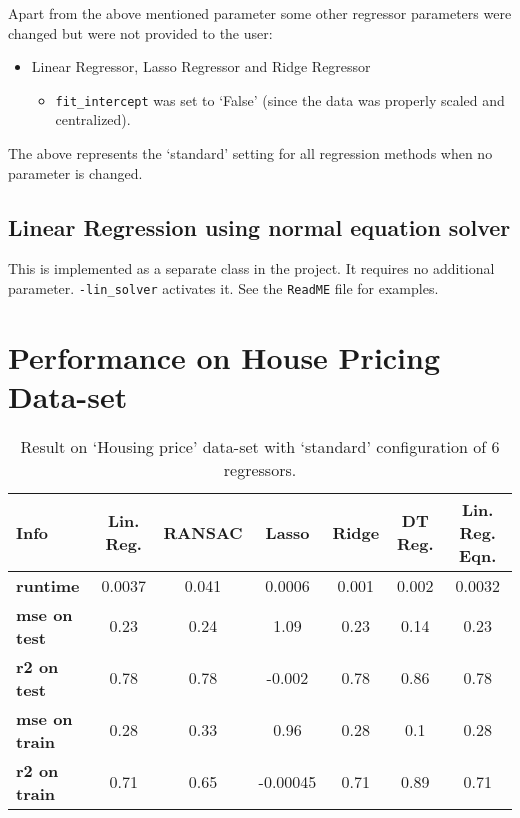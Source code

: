 \documentclass[12pt]{article}
\begin{document}
Apart from the above mentioned parameter some other regressor parameters were changed but were not provided to the user:

\begin{itemize}
\item Linear Regressor, Lasso Regressor and Ridge Regressor
\begin{itemize}
\item \texttt{fit\_intercept} was set to `False' (since the data was properly scaled and centralized).
\end{itemize}
\end{itemize}

The above represents the `standard' setting for all regression methods when no parameter is changed. 

\subsection*{Linear Regression using normal equation solver}

This is implemented as a separate class in the project. It requires no additional parameter. \texttt{-lin\_solver} activates it. See the \texttt{ReadME} file for examples.

\section*{Performance on House Pricing Data-set}

\begin{table}[!hptb]
\begin{tabular}{|l|c|c|c|c|c|c|}
\hline
\textbf{Info} & \textbf{Lin. Reg.} & \textbf{RANSAC} & \textbf{Lasso} & \textbf{Ridge} & \textbf{DT Reg.} & \textbf{Lin. Reg. Eqn.} \\\hline
\textbf{runtime} & 0.0037 &	0.041 & 0.0006	 & 0.001 & 0.002 & 0.0032 \\
\textbf{mse on test} & 0.23 & 0.24 &	1.09 & 0.23 & 0.14 &	0.23 \\
\textbf{r2 on test} & 0.78 & 0.78 & -0.002 &	0.78 & 0.86 & 0.78 \\
\textbf{mse on train} & 0.28 & 0.33 & 0.96 & 0.28 & 0.1 &	 0.28 \\
\textbf{r2 on train} & 0.71 & 0.65 & -0.00045 & 0.71 & 0.89 & 0.71 \\\hline
\end{tabular}
\caption{Result on `Housing price' data-set with `standard' configuration of 6 regressors.}
\end{table}
\end{document}
